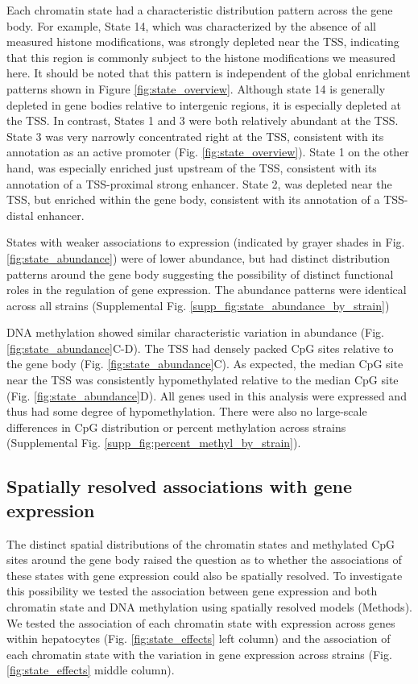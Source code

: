 \documentclass[
  11pt,
]{article}
\begin{document}
Each chromatin state had a characteristic distribution pattern across
the gene body. For example, State 14, which was characterized by the
absence of all measured histone modifications, was strongly depleted
near the TSS, indicating that this region is commonly subject to the
histone modifications we measured here. It should be noted that this
pattern is independent of the global enrichment patterns shown in Figure
\ref{fig:state_overview}. Although state 14 is generally depleted in
gene bodies relative to intergenic regions, it is especially depleted at
the TSS. In contrast, States 1 and 3 were both relatively abundant at
the TSS. State 3 was very narrowly concentrated right at the TSS,
consistent with its annotation as an active promoter (Fig.
\ref{fig:state_overview}). State 1 on the other hand, was especially
enriched just upstream of the TSS, consistent with its annotation of a
TSS-proximal strong enhancer. State 2, was depleted near the TSS, but
enriched within the gene body, consistent with its annotation of a
TSS-distal enhancer.

States with weaker associations to expression (indicated by grayer
shades in Fig. \ref{fig:state_abundance}) were of lower abundance, but
had distinct distribution patterns around the gene body suggesting the
possibility of distinct functional roles in the regulation of gene
expression. The abundance patterns were identical across all strains
(Supplemental Fig. \ref{supp_fig:state_abundance_by_strain})

DNA methylation showed similar characteristic variation in abundance
(Fig. \ref{fig:state_abundance}C-D). The TSS had densely packed CpG
sites relative to the gene body (Fig. \ref{fig:state_abundance}C). As
expected, the median CpG site near the TSS was consistently
hypomethylated relative to the median CpG site (Fig.
\ref{fig:state_abundance}D). All genes used in this analysis were
expressed and thus had some degree of hypomethylation. There were also
no large-scale differences in CpG distribution or percent methylation
across strains (Supplemental Fig.
\ref{supp_fig:percent_methyl_by_strain}).

\hypertarget{spatially-resolved-associations-with-gene-expression}{%
\subsection{Spatially resolved associations with gene
expression}\label{spatially-resolved-associations-with-gene-expression}}

The distinct spatial distributions of the chromatin states and
methylated CpG sites around the gene body raised the question as to
whether the associations of these states with gene expression could also
be spatially resolved. To investigate this possibility we tested the
association between gene expression and both chromatin state and DNA
methylation using spatially resolved models (Methods). We tested the
association of each chromatin state with expression across genes within
hepatocytes (Fig. \ref{fig:state_effects} left column) and the
association of each chromatin state with the variation in gene
expression across strains (Fig. \ref{fig:state_effects} middle column).
\end{document}
